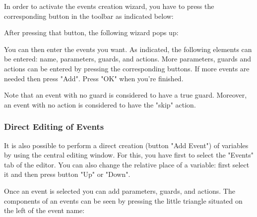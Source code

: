 In order to activate the events creation wizard, you have to press the corresponding button in the toolbar as indicated below:


After pressing that button, the following wizard pops up: 


You can then enter the events you want. As indicated, the following elements can be entered: name, parameters, guards, and actions. More parameters, guards and actions can be entered by pressing the corresponding buttons. If more events are needed then press "Add". Press "OK" when you’re finished.

Note that an event with no guard is considered to have a true guard. Moreover, an event with no action is considered to have the "skip" action. 

\subsubsection{Direct Editing of Events}

It is also possible to perform a direct creation (button "Add Event") of variables by using the central editing window. For this, you have first to select the "Events" tab of the editor. You can also change the relative place of a variable: first select it and then press button "Up" or "Down".


Once an event is selected you can add parameters, guards, and actions. The components of an events can be seen by pressing the little triangle situated on the left of the event name: 

